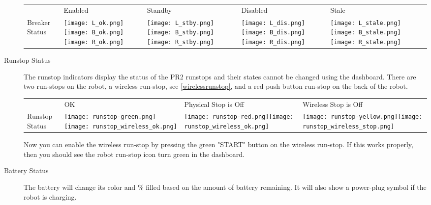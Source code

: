 \begin{description}
    \begin{tabular}{m{2.6cm}SSSS}
     & Enabled & Standby & Disabled & Stale\\
    Breaker Status & \texttt{[image: L\_ok.png]}\texttt{[image: B\_ok.png]}\texttt{[image: R\_ok.png]}&
                     \texttt{[image: L\_stby.png]}\texttt{[image: B\_stby.png]}\texttt{[image: R\_stby.png]}&
                     \texttt{[image: L\_dis.png]}\texttt{[image: B\_dis.png]}\texttt{[image: R\_dis.png]}&
                     \texttt{[image: L\_stale.png]}\texttt{[image: B\_stale.png]}\texttt{[image: R\_stale.png]}\\
   \end{tabular}



\item[Runstop Status] The runstop indicators display the status of the PR2 runstops and their states cannot be changed using the dashboard. 
There are two run-stops on the robot, a wireless run-stop, see \ref{wirelessrunstop}, and a red push button run-stop on the back of the robot.\\

    \begin{tabular}{m{2.6cm}SSS}
     & OK & Physical Stop is Off & Wireless Stop is Off\\
    Runstop Status & \texttt{[image: runstop-green.png]}\texttt{[image: runstop\_wireless\_ok.png]}&
                     \texttt{[image: runstop-red.png]}\texttt{[image: runstop\_wireless\_ok.png]}&
                     \texttt{[image: runstop-yellow.png]}\texttt{[image: runstop\_wireless\_stop.png]}\\
   \end{tabular}

Now you can enable the wireless run-stop by pressing the green "START" button on the wireless run-stop. If this works properly, then you should see the robot run-stop icon turn green in the dashboard.

\item[Battery Status]
The battery will change its color and \% filled based on the amount of battery remaining. It will also show a power-plug symbol if the robot is charging.
                                                                                                                      

\end{description}
